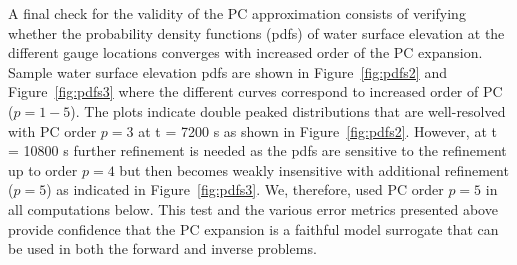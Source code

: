 
 
A final check for the validity of the PC approximation 
consists of verifying whether the probability density
functions (pdfs) of water surface elevation at the different gauge locations
converges with increased order of the PC expansion.  Sample
water surface elevation pdfs are shown in Figure~\ref{fig:pdfs2}
and Figure~\ref{fig:pdfs3} where
the different curves correspond to increased order of PC ($p= 1-5$).
The plots indicate double peaked distributions that are
well-resolved with PC order $p=3$ at t = 7200 s as shown in Figure~\ref{fig:pdfs2}.
However, at t = 10800 s further refinement is needed as the pdfs are
sensitive to the refinement up to order $p=4$ but then becomes weakly 
insensitive with additional refinement  ($p = 5$) as indicated in Figure~\ref{fig:pdfs3}. 
We, therefore, used PC order $p = 5$ in all computations below.
This test and the various error metrics presented above provide confidence that the PC expansion is a faithful 
model surrogate that can be used in both the forward and inverse problems. 

